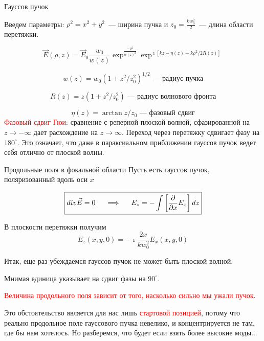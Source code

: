 \documentclass[9pt, compress, xcolor=table]{beamer}
\begin{document}
\begin{frame}{Гауссов пучок}

Введем параметры: $\rho^2 = x^2 + y^2$~--- ширина пучка и $z_0 = \frac{k w_0^2}{2}$~--- длина области перетяжки.

\begin{equation*}
\boxed{
\vec E(\rho,z) = \vec E_0 \frac{w_0}{w(z)}
\exp^{\frac{-\rho^2}{w(z)^2}}\exp^{\imath [kz - \eta(z) + k \rho^2/2R(z)]}}
\end{equation*}

\begin{equation*}
w(z) = w_0(1 + z^2/z_0^2)^{1/2}\text{~--- радиус пучка}
\end{equation*}

\begin{equation*}
R(z) = z(1 + z^2/z_0^2)\text{~--- радиус волнового фронта}
\end{equation*}

\begin{equation*}
\eta (z) = \arctan {z/z_0}\text{~--- фазовый сдвиг}
\end{equation*}
\textcolor{red}{Фазовый сдвиг Гюи}: сравнение с реперной плоской волной, сфазированной на $z \rightarrow -\infty$
дает расхождение на $z \rightarrow \infty$. Переход через перетяжку сдвигает фазу на $180^{\circ}$. Это означает, что даже в параксиальном приближении гауссов пучок ведет себя отлично от плоской волны.

\end{frame}


\begin{frame}{Продольные поля в фокальной области}
Пусть есть гауссов пучок, поляризованный вдоль оси $x$

\begin{equation*}
\boxed{
div\vec E = 0\hspace{0.5cm}\Longrightarrow\hspace{0.5 cm}E_z = - \int\left[\frac{\partial}{\partial x} E_x\right] dz}
\end{equation*} 

В плоскости перетяжки получим \begin{equation*} E_z(x,y,0) = -\imath \frac{2x}{kw_0^2} E_x(x,y,0)\end{equation*}

Итак, еще раз убеждаемся гауссов пучок не может быть плоской волной.

Мнимая единица указывает на сдвиг фазы на $90^{\circ}$. 

\textcolor{red}{Величина продольного поля зависит от того, насколько сильно мы ужали пучок.}

Это обстоятельство является для нас лишь \textcolor{red}{стартовой позицией}, потому что реально продольное поле гауссового пучка невелико, и концентрируется не там, где бы нам хотелось. Но разберемся, что будет если взять более высокие моды...

\end{frame}
\end{document}
